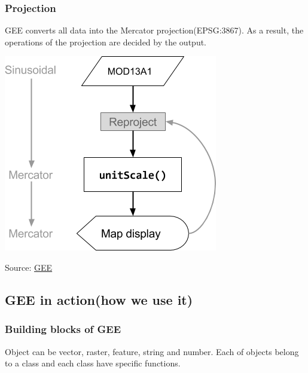 \documentclass[
  letterpaper,
  DIV=11,
  numbers=noendperiod]{scrreprt}
\begin{document}
\hypertarget{projection}{%
\subsubsection{Projection}\label{projection}}

GEE converts all data into the Mercator projection(EPSG:3867). As a
result, the operations of the projection are decided by the output.

\includegraphics{./images/paste-1BDFAF9D.png}

Source:
\href{https://developers.google.com/earth-engine/guides/projections}{GEE}

\hypertarget{gee-in-actionhow-we-use-it}{%
\subsection{GEE in action(how we use
it)}\label{gee-in-actionhow-we-use-it}}

\hypertarget{building-blocks-of-gee}{%
\subsubsection{Building blocks of GEE}\label{building-blocks-of-gee}}

Object can be vector, raster, feature, string and number. Each of
objects belong to a class and each class have specific functions.
\end{document}
